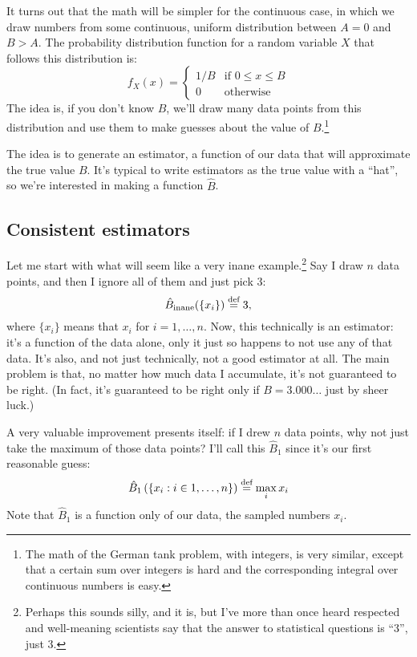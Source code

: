 It turns out that the math will be simpler for the continuous case, in which
we draw numbers from some continuous, uniform distribution between $A=0$ and
$B>A$. The probability distribution function for a random variable $X$ that
follows this distribution is:
\begin{equation}\label{eq:uniform_pdf}
f_X(x) = \begin{cases}
  1/B &\text{if $0 \leq x \leq B$} \\
  0 &\text{otherwise}
\end{cases}
\end{equation}
The idea is, if you don't know $B$, we'll draw many data points from this
distribution and use them to make guesses about the value of $B$.\footnote{The math
of the German tank problem, with integers, is very similar, except that a
certain sum over integers is hard and the corresponding integral over
continuous numbers is easy.}

The idea is to generate an estimator, a function of our data that will
approximate the true value $B$. It's typical to write estimators as the
true value with a ``hat'', so we're interested in making a function $\hat{B}$.

\subsection{Consistent estimators}

Let me start with what will seem like a very inane example.\footnote{Perhaps
this sounds silly, and it is, but I've more than once heard respected and
well-meaning scientists say that the answer to statistical questions is ``3'',
just 3.}  Say I draw $n$ data points, and then I ignore all of them and just
pick 3:
\begin{equation}
\hat{B}_\mathrm{inane}(\{x_i\}) \stackrel{\text{def}}{=} 3,
\end{equation}
where $\{x_i\}$ means that $x_i$ for $i = 1, \ldots, n$.
Now, this technically is an estimator: it's a function of the
data alone, only it just so happens to not use any of that data. It's also,
and not just technically, not a good estimator at all. The main problem is
that, no matter how much data I accumulate, it's not guaranteed to be right.
(In fact, it's guaranteed to be right only if $B=3.000\ldots$ just by sheer luck.)

A very valuable improvement presents itself: if I drew $n$ data points, why not
just take the maximum of those data points? I'll call this $\hat{B}_1$ since
it's our first reasonable guess:
\begin{equation}\label{eq:hatb1}
\hat{B}_1\left( \{x_i : i \in 1, \ldots, n\} \right) \stackrel{\text{def}}{=} \max_i x_i
\end{equation}
Note that $\hat{B}_1$ is a function only of our data, the sampled numbers $x_i$.

